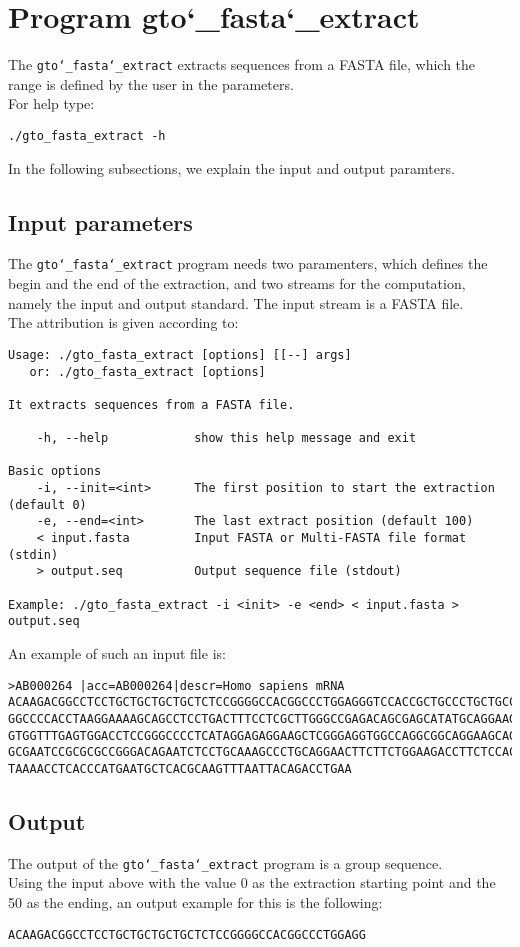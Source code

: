 \section{Program gto\char`_fasta\char`_extract}
The \texttt{gto\char`_fasta\char`_extract} extracts sequences from a FASTA file, which the range is defined by the user in the parameters.\\
For help type:
\begin{lstlisting}
./gto_fasta_extract -h
\end{lstlisting}
In the following subsections, we explain the input and output paramters.

\subsection*{Input parameters}

The \texttt{gto\char`_fasta\char`_extract} program needs two paramenters, which defines the begin and the end of the extraction, and two streams for the computation, namely the input and output standard. The input stream is a FASTA file.\\
The attribution is given according to:
\begin{lstlisting}
Usage: ./gto_fasta_extract [options] [[--] args]
   or: ./gto_fasta_extract [options]

It extracts sequences from a FASTA file.

    -h, --help            show this help message and exit

Basic options
    -i, --init=<int>      The first position to start the extraction (default 0)
    -e, --end=<int>       The last extract position (default 100)
    < input.fasta         Input FASTA or Multi-FASTA file format (stdin)
    > output.seq          Output sequence file (stdout)

Example: ./gto_fasta_extract -i <init> -e <end> < input.fasta > output.seq
\end{lstlisting}
An example of such an input file is:
\begin{lstlisting}
>AB000264 |acc=AB000264|descr=Homo sapiens mRNA 
ACAAGACGGCCTCCTGCTGCTGCTGCTCTCCGGGGCCACGGCCCTGGAGGGTCCACCGCTGCCCTGCTGCCATTGTCCCC
GGCCCCACCTAAGGAAAAGCAGCCTCCTGACTTTCCTCGCTTGGGCCGAGACAGCGAGCATATGCAGGAAGCGGCAGGAA
GTGGTTTGAGTGGACCTCCGGGCCCCTCATAGGAGAGGAAGCTCGGGAGGTGGCCAGGCGGCAGGAAGCAGGCCAGTGCC
GCGAATCCGCGCGCCGGGACAGAATCTCCTGCAAAGCCCTGCAGGAACTTCTTCTGGAAGACCTTCTCCACCCCCCCAGC
TAAAACCTCACCCATGAATGCTCACGCAAGTTTAATTACAGACCTGAA
\end{lstlisting}

\subsection*{Output}
The output of the \texttt{gto\char`_fasta\char`_extract} program is a group sequence.\\
Using the input above with the value 0 as the extraction starting point and the 50 as the ending, an output example for this is the following:
\begin{lstlisting}
ACAAGACGGCCTCCTGCTGCTGCTGCTCTCCGGGGCCACGGCCCTGGAGG
\end{lstlisting}